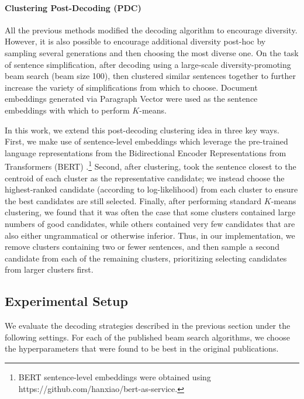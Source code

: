\paragraph{Clustering Post-Decoding (PDC)}
All the previous methods modified the decoding algorithm to encourage diversity.
However, it is also possible to encourage additional diversity post-hoc by sampling several generations and then choosing the most diverse one.
On the task of sentence simplification, after decoding using a large-scale diversity-promoting beam search (beam size 100), \citet{kriz2019complexity} then clustered similar sentences together to further increase the variety of simplifications from which to choose.
Document embeddings generated via Paragraph Vector \cite{Le2014distributed} were used as the sentence embeddings with which to perform $K$-means. 

In this work, we extend this post-decoding clustering idea in three key ways.
First, we make use of sentence-level embeddings which leverage the pre-trained language representations from the Bidirectional Encoder Representations from Transformers (BERT) \cite{devlin2018bert}.\footnote{BERT sentence-level embeddings were obtained using https://github.com/hanxiao/bert-as-service.}
Second, after clustering, \citet{kriz2019complexity} took the sentence closest to the centroid of each cluster as the representative candidate; we instead choose the highest-ranked candidate (according to log-likelihood) from each cluster to ensure the best candidates are still selected.
Finally, after performing standard $K$-means clustering, we found that it was often the case that some clusters contained large numbers of good candidates, while others contained very few candidates that are also either ungrammatical or otherwise inferior.
Thus, in our implementation, we remove clusters containing two or fewer sentences, and then sample a second candidate from each of the remaining clusters, prioritizing selecting candidates from larger clusters first.


\subsection{Experimental Setup}
We evaluate the decoding strategies described in the previous section under the following settings.
For each of the published beam search algorithms, we choose the hyperparameters that were found to be best in the original publications.\\

